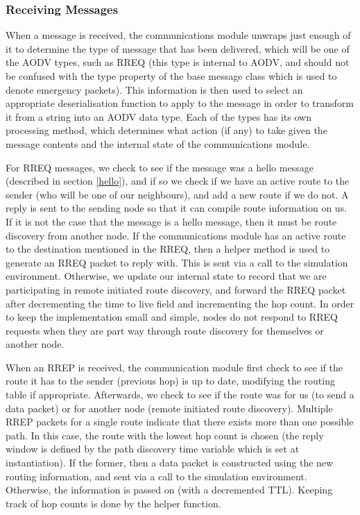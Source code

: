 \subsubsection{Receiving Messages}
When a message is received, the communications module unwraps just enough of it to determine the type of message that has been delivered, which will be one of the AODV types, such as RREQ (this type is internal to AODV, and should not be confused with the type property of the base message class which is used to denote emergency packets). This information is then used to select an appropriate deserialisation function to apply to the message in order to transform it from a string into an AODV data type. Each of the types has its own processing method, which determines what action (if any) to take given the message contents and the internal state of the communications module.

For RREQ messages, we check to see if the message was a hello message (described in section \ref{hello}), and if so we check if we have an active route to the sender (who will be one of our neighbours), and add a new route if we do not. A reply is sent to the sending node so that it can compile route information on us. If it is not the case that the message is a hello message, then it must be route discovery from another node. If the communications module has an active route to the destination mentioned in the RREQ, then a helper method is used to generate an RREQ packet to reply with. This is sent via a call to the simulation environment. Otherwise, we update our internal state to record that we are participating in remote initiated route discovery, and forward the RREQ packet after decrementing the time to live field and incrementing the hop count. In order to keep the implementation small and simple, nodes do not respond to RREQ requests when they are part way through route discovery for themselves or another node.

When an RREP is received, the communication module first check to see if the route it has to the sender (previous hop) is up to date, modifying the routing table if appropriate. Afterwards, we check to see if the route was for us (to send a data packet) or for another node (remote initiated route discovery). Multiple RREP packets for a single route indicate that there exists more than one possible path. In this case, the route with the lowest hop count is chosen (the reply window is defined by the path discovery time variable which is set at instantiation). If the former, then a data packet is constructed using the new routing information, and sent via a call to the simulation environment. Otherwise, the information is passed on (with a decremented TTL). Keeping track of hop counts is done by the helper function.

